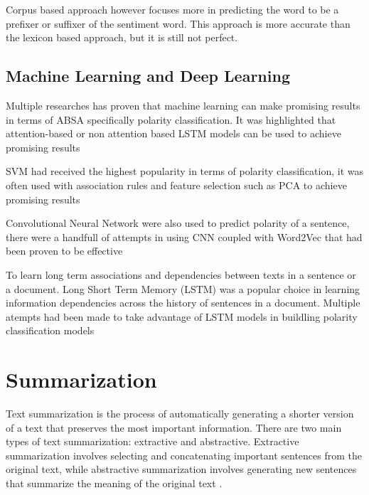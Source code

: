 Corpus based approach however focuses more in predicting the word to be a prefixer or suffixer of the sentiment word. This approach is more accurate than the lexicon based approach, but it is still not perfect. \cite{SOABSAUMLT2021}
\subsection{Machine Learning and Deep Learning}
Multiple researches has proven that machine learning can make promising results in terms of ABSA specifically polarity classification. It was highlighted that attention-based or non attention based LSTM models can be used to achieve promising results \cite{SOABSAUMLT2021} \cite{9260162}

\noindent SVM had received the highest popularity in terms of polarity classification, it was often used with association rules and feature selection such as PCA to achieve promising results \cite{SOABSAUMLT2021} \cite{Zainuddin2018HybridSC} \cite{AlSmadi2017DeepRN}

\noindent Convolutional Neural Network were also used to predict polarity of a sentence, there were a handfull of attempts in using CNN coupled with Word2Vec that had been proven to be effective \cite{SOABSAUMLT2021} \cite{ABSAUDNASO2020} \cite{Rezaeinia2019SentimentAB} \cite{10.1016/j.neucom.2019.04.038} 

\noindent To learn long term associations and dependencies between texts in a sentence or a document. Long Short Term Memory (LSTM) was a popular choice in learning information dependencies across the history of sentences in a document. Multiple atempts had been made to take advantage of LSTM models in buildling polarity classification models \cite{he-etal-2018-exploiting} \cite{10.1016/j.future.2018.10.041} \cite{Sindhu2019AspectBasedOM} 

\pagebreak

\section{Summarization}
Text summarization is the process of automatically generating a shorter version of a text that preserves the most important information. There are two main types of text summarization: extractive and abstractive. Extractive summarization involves selecting and concatenating important sentences from the original text, while abstractive summarization involves generating new sentences that summarize the meaning of the original text \cite{ATSMACR2022} \cite{ATSUSTSRAB2016}.

